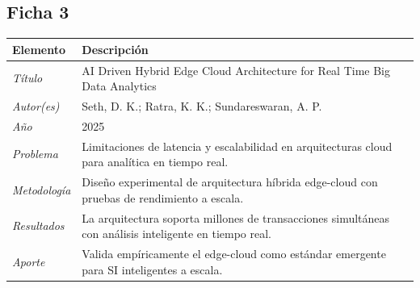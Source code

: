 \documentclass[conference]{IEEEtran}
\begin{document}
\subsection*{Ficha 3}
\begin{center}
\small
\begin{minipage}{\columnwidth}
\label{tab:ficha3}
\begin{tabular}{p{1.6cm} p{5.9cm}}
\toprule
\textbf{Elemento} & \textbf{Descripción} \\
\midrule
\textit{Título} & AI Driven Hybrid Edge Cloud Architecture for Real Time Big Data Analytics \\
\addlinespace
\textit{Autor(es)} & Seth, D. K.; Ratra, K. K.; Sundareswaran, A. P. \\
\addlinespace
\textit{Año} & 2025 \\
\addlinespace
\textit{Problema} & Limitaciones de latencia y escalabilidad en arquitecturas cloud para analítica en tiempo real. \\
\addlinespace
\textit{Metodología} & Diseño experimental de arquitectura híbrida edge-cloud con pruebas de rendimiento a escala. \\
\addlinespace
\textit{Resultados} & La arquitectura soporta millones de transacciones simultáneas con análisis inteligente en tiempo real. \\
\addlinespace
\textit{Aporte} & Valida empíricamente el edge-cloud como estándar emergente para SI inteligentes a escala. \\
\bottomrule
\end{tabular}
\end{minipage}
\end{center}

 
\end{document}

